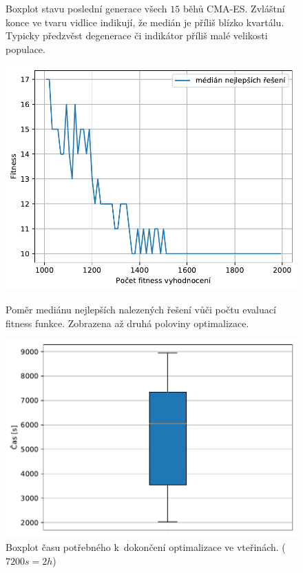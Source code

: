 \begin{figure}[H]
\begin{minipage}[t]{0.475\linewidth}
        \caption{Boxplot stavu poslední generace všech $15$ běhů CMA-ES. Zvláštní konce ve tvaru vidlice indikují, že medián je příliš blízko kvartálu. Typicky předzvěst degenerace či indikátor příliš malé velikosti populace. }
        \label{fg:hifu:cmaes:lastGen}
    \end{minipage}
\end{figure}

\begin{figure}[H]
    \begin{minipage}[t]{0.475\linewidth}
    	\includegraphics[width=\textwidth]{obrazky-figures/statistics/HIFU/blob/4/CMAES/bestsToFitness_1.pdf}
    	\caption{Poměr mediánu nejlepších nalezených řešení vůči počtu evaluací fitness funkce. Zobrazena až druhá poloviny optimalizace.}
    	\label{fg:hifu:cmaes:fitPerf}
    \end{minipage}
    \hfill
    \begin{minipage}[t]{0.475\linewidth}
        \includegraphics[width=\linewidth]{obrazky-figures/statistics/HIFU/blob/4/CMAES/timeBoxplot_WithOutliers.pdf}
        \caption{Boxplot času potřebného k~dokončení optimalizace ve vteřinách. ($7200s = 2h$)}
        \label{fg:hifu:cmaes:time}
    \end{minipage}
\end{figure}


